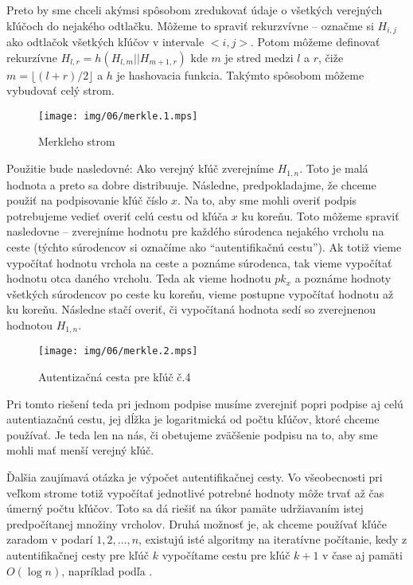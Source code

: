 Preto by sme chceli akýmsi spôsobom zredukovať údaje o všetkých
verejných kľúčoch do nejakého odtlačku. Môžeme to spraviť rekurzvívne
-- označme si $H_{i,j}$ ako odtlačok všetkých kľúčov v intervale $<i,j>$.
Potom môžeme definovať rekurzívne $H_{l,r}=h(H_{l,m} || H_{m+1,r})$ kde
$m$ je stred medzi $l$ a $r$, čiže $m=\lfloor (l+r)/2 \rfloor$ a
$h$ je hashovacia funkcia. Takýmto spôsobom môžeme vybudovať celý
strom.
\begin{figure}[h]
    \centering
    \texttt{[image: img/06/merkle.1.mps]}
    \caption{Merkleho strom}
    \label{fig:merkle}
\end{figure}

Použitie bude nasledovné: Ako verejný kľúč zverejníme $H_{1,n}$. Toto je
malá hodnota a preto sa dobre distribuuje. Následne, predpokladajme, že
chceme použiť na podpisovanie kľúč číslo $x$. Na to, aby sme mohli overiť
podpis potrebujeme vedieť overiť celú cestu od kľúča $x$ ku koreňu. Toto
môžeme spraviť nasledovne -- zverejníme hodnotu pre každého súrodenca
nejakého vrcholu na ceste (týchto súrodencov si označíme ako
``autentifikačnú cestu'').
Ak totiž vieme vypočítať hodnotu vrchola na ceste a poznáme
súrodenca, tak vieme vypočítať hodnotu otca daného vrcholu.
Teda ak vieme hodnotu $pk_x$ a poznáme hodnoty všetkých súrodencov po ceste ku
koreňu, vieme postupne vypočítať hodnotu až ku koreňu. Následne stačí
overiť, či vypočítaná hodnota sedí so zverejnenou hodnotou $H_{1,n}$.

\begin{figure}[h]
    \centering
    \texttt{[image: img/06/merkle.2.mps]}
    \caption{Autentizačná cesta pre kľúč č.4}
\end{figure}

Pri tomto riešení teda pri jednom podpise musíme zverejniť popri podpise aj
celú autentiazačnú cestu, jej dĺžka je logaritmická od počtu kľúčov, ktoré
chceme používať. Je teda len na nás, či obetujeme zväčšenie podpisu na to,
aby sme mohli mať menší verejný kľúč.

Ďalšia zaujímavá otázka je výpočet autentifikačnej cesty. Vo všeobecnosti
pri veľkom strome totiž vypočítať jednotlivé potrebné hodnoty môže trvať až
čas úmerný počtu kľúčov. Toto sa dá riešiť na úkor pamäte udržiavaním istej
predpočítanej množiny vrcholov. Druhá možnosť je, ak chceme používať kľúče
zaradom v podarí $1,2,\dots,n$, existujú isté algoritmy na iteratívne
počítanie, kedy z autentifikačnej cesty pre kľúč $k$ vypočítame cestu pre
kľúč $k+1$ v čase aj pamäti $O(\log n)$, napríklad podľa \cite{merkle_iter}.

